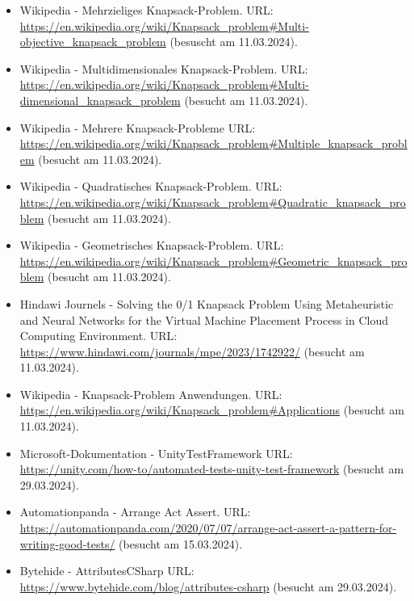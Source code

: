 \begin{itemize}[leftmargin=0pt]
    \item Wikipedia - Mehrzieliges Knapsack-Problem. {\scriptsize URL:} \url{https://en.wikipedia.org/wiki/Knapsack_problem#Multi-objective_knapsack_problem} (besuscht am 11.03.2024).
    \item Wikipedia - Multidimensionales Knapsack-Problem. {\scriptsize URL:} \url{https://en.wikipedia.org/wiki/Knapsack_problem#Multi-dimensional_knapsack_problem} (besucht am 11.03.2024).
    \item Wikipedia - Mehrere Knapsack-Probleme {\scriptsize URL:} \url{https://en.wikipedia.org/wiki/Knapsack_problem#Multiple_knapsack_problem} (besucht am 11.03.2024).
    \item Wikipedia - Quadratisches Knapsack-Problem. {\scriptsize URL:} \url{https://en.wikipedia.org/wiki/Knapsack_problem#Quadratic_knapsack_problem} (besucht am 11.03.2024).
    \item Wikipedia - Geometrisches Knapsack-Problem. {\scriptsize URL:} \url{https://en.wikipedia.org/wiki/Knapsack_problem#Geometric_knapsack_problem} (besucht am 11.03.2024).
    \item Hindawi Journels - Solving the 0/1 Knapsack Problem Using Metaheuristic and Neural Networks for the Virtual Machine Placement Process in Cloud Computing Environment. {\scriptsize URL:} \url{https://www.hindawi.com/journals/mpe/2023/1742922/} (besucht am 11.03.2024).
    \item Wikipedia - Knapsack-Problem Anwendungen. {\scriptsize URL:} \url{https://en.wikipedia.org/wiki/Knapsack_problem#Applications} (besucht am 11.03.2024).
    \item Microsoft-Dokumentation - UnityTestFramework {\scriptsize URL:} \url{https://unity.com/how-to/automated-tests-unity-test-framework} (besucht am 29.03.2024).
    \item Automationpanda - Arrange Act Assert. {\scriptsize URL:} \url{https://automationpanda.com/2020/07/07/arrange-act-assert-a-pattern-for-writing-good-tests/} (besucht am 15.03.2024).
    \item Bytehide - AttributesCSharp {\scriptsize URL:} \url{https://www.bytehide.com/blog/attributes-csharp} (besucht am 29.03.2024).
\end{itemize}